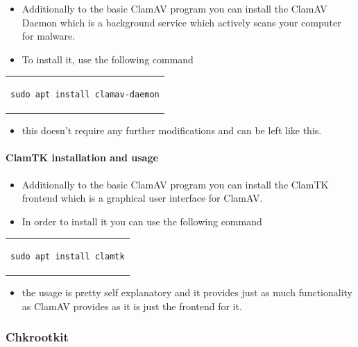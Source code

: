 \documentclass[a4paper,10pt]{article}
\begin{document}
\begin{itemize}[leftmargin=*]
\item Additionally to the basic ClamAV program you can install the ClamAV Daemon which is a background service which actively scans your computer for malware.
\item To install it, use the following command
\end{itemize}

\begin{center}
\begin{tabular}{c}
\begin{lstlisting}
sudo apt install clamav-daemon
\end{lstlisting}
\end{tabular}
\end{center}

\begin{itemize}[leftmargin=*]
\item this doesn't require any further modifications and can be left like this.
\end{itemize}

\paragraph{ClamTK installation and usage}

\begin{itemize}[leftmargin=*]
\item Additionally to the basic ClamAV program you can install the ClamTK frontend which is a graphical user interface for ClamAV.
\item In order to install it you can use the following command
\end{itemize}

\begin{center}
\begin{tabular}{c}
\begin{lstlisting}
sudo apt install clamtk
\end{lstlisting}
\end{tabular}
\end{center}

\begin{itemize}[leftmargin=*]
\item the usage is pretty self explanatory and it provides just as much functionality as ClamAV provides as it is just the frontend for it.
\end{itemize}

\subsubsection{Chkrootkit}
\end{document}
